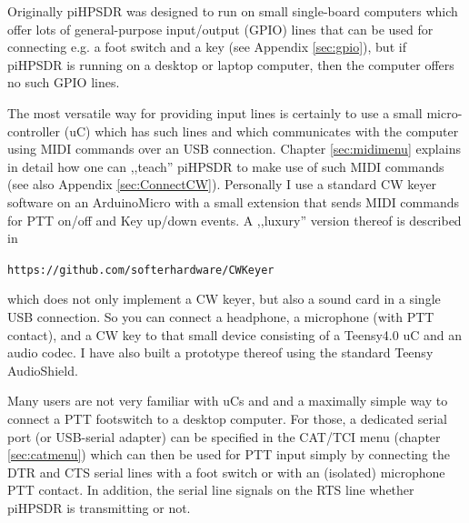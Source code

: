 \documentclass[12pt]{book}
\def\pH{pi\-HPSDR\xspace}
\begin{document}
Originally \pH was designed to run on small single-board computers which offer lots of general-purpose
input/output (GPIO) lines that can be used for connecting e.g. a foot switch and a key (see Appendix
\ref{sec:gpio}), but if \pH is
running on a desktop or laptop computer, then the computer offers no such GPIO lines.

The most versatile way for providing input lines is certainly to use a small micro-controller (uC) which
has such lines and which communicates with the computer using MIDI commands over an USB connection.
Chapter \ref{sec:midimenu} explains in detail how one can ,,teach'' \pH to make use of such MIDI commands
(see also Appendix \ref{sec:ConnectCW}). Personally I use a standard CW keyer software on an ArduinoMicro
with a small extension that sends MIDI commands for PTT on/off and Key up/down events. A ,,luxury''
version thereof is described in

\texttt{https://github.com/softerhardware/CWKeyer}

which does not only implement a CW keyer, but also a sound card in a single USB connection. So you can
connect a headphone, a microphone (with PTT contact), and a CW key to that small device consisting of
a Teensy4.0 uC and an audio codec. I have also built a prototype thereof using the standard Teensy
AudioShield.

Many users are not very familiar with uCs and and a maximally simple way to connect a PTT footswitch to
a desktop computer. For those, a dedicated serial port (or USB-serial adapter) can be
specified in the CAT/TCI menu (chapter \ref{sec:catmenu}) which can then be used for PTT input simply
by connecting the DTR and CTS serial lines with a foot switch or with an (isolated) microphone PTT contact.
In addition, the serial line signals on the RTS line whether \pH is transmitting or not.

\end{document}
